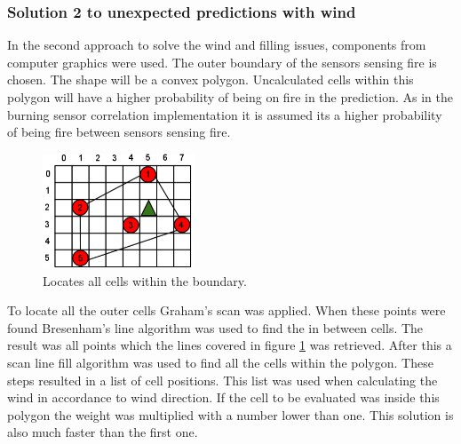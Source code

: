 \subsubsection{Solution 2 to unexpected predictions with wind}
In the second approach to solve the wind and filling issues, components from computer graphics were used. The outer boundary of the sensors sensing fire is chosen. The shape will be a convex polygon. Uncalculated cells within this polygon will have a higher probability of being on fire in the prediction. As in the burning sensor correlation implementation it is assumed its a higher probability of being fire between sensors sensing fire.
\begin{figure}[here]
  \centering
      \includegraphics[width=0.4\textwidth]{solution/graphics/graphical-boundary.png}
  \caption{Locates all cells within the boundary.}
  \label{fig:graphical-boundary}
\end{figure}
To locate all the outer cells Graham's scan \cite{graham} was applied. When these points were found Bresenham's line algorithm was used to find the in between cells. The result was all points which the lines covered in figure \ref{fig:graphical-boundary} was retrieved. After this a scan line fill algorithm was used to find all the cells within the polygon. These steps resulted in a list of cell positions. This list was used when calculating the wind in accordance to wind direction. If the cell to be evaluated was inside this polygon the weight was multiplied with a number lower than one. This solution is also much faster than the first one.

